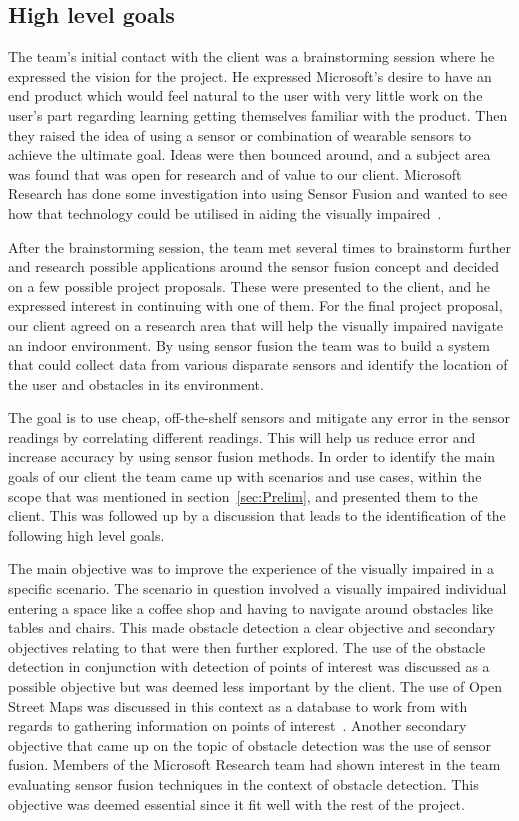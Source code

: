 \documentclass[prodmode,acmtosem]{acmsmall} %
\begin{document}
\subsection{High level goals}
The team's initial contact with the client was a brainstorming session where he expressed the vision for the project. He expressed Microsoft's desire to have an end product which would feel natural to the user with very little work on the user's part regarding learning getting themselves familiar with the product. Then they raised the idea of using a sensor or combination of wearable sensors to achieve the ultimate goal. Ideas were then bounced around, and a subject area was found that was open for research and of value to our client.
Microsoft Research has done some investigation into using Sensor Fusion and wanted to see how that technology could be utilised in aiding the visually impaired~\cite{Gear2012}.

After the brainstorming session, the team met several times to brainstorm further and research possible applications around the sensor fusion concept and decided on a few possible project proposals.
These were presented to the client, and he expressed interest in continuing with one of them.
For the final project proposal, our client agreed on a research area that will help the visually impaired navigate an indoor environment.
By using sensor fusion the team was to build a system that could collect data from various disparate sensors and identify the location of the user and obstacles in its environment.

The goal is to use cheap, off-the-shelf sensors and mitigate any error in the sensor readings by correlating different readings. This will help us reduce error and increase accuracy by using sensor fusion methods.
In order to identify the main goals of our client the team came up with scenarios and use cases, within the scope that was mentioned in section~\ref{sec:Prelim}, and presented them to the client. This was followed up by a discussion that leads to the identification of the following high level goals.


The main objective was to improve the experience of the visually impaired in a specific scenario. The scenario in question involved a visually impaired individual entering a space like a coffee shop and having to navigate around obstacles like tables and chairs.
This made obstacle detection a clear objective and secondary objectives relating to that were then further explored. The use of the obstacle detection in conjunction with detection of points of interest was discussed as a possible objective but was deemed less important by the client.
The use of Open Street Maps was discussed in this context as a database to work from with regards to gathering information on points of interest~\cite{OSM}.
Another secondary objective that came up on the topic of obstacle detection was the use of sensor fusion. Members of the Microsoft Research team had shown interest in the team evaluating sensor fusion techniques in the context of obstacle detection. This objective was deemed essential since it fit well with the rest of the project.
\end{document}

